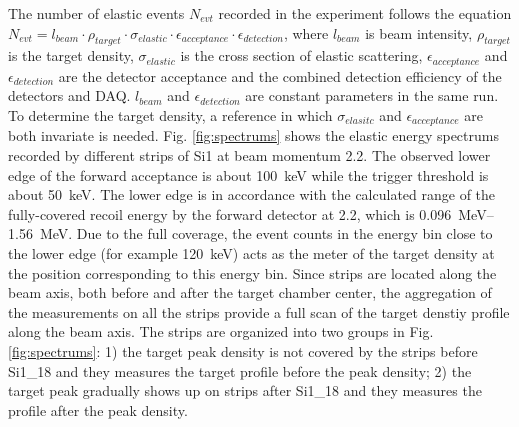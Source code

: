 \documentclass[fleqn,twocolumn,a4paper]{ikpar}
\begin{document}
The number of elastic events $N_{evt}$ recorded in the experiment follows the
equation $N_{evt} =
l_{beam}\cdot\rho_{target}\cdot\sigma_{elastic}\cdot\epsilon_{acceptance}\cdot\epsilon_{detection}$,
where $l_{beam}$ is beam intensity, $\rho_{target}$ is the target density,
$\sigma_{elastic}$ is the cross section of elastic scattering,
$\epsilon_{acceptance}$ and $\epsilon_{detection}$ are the detector acceptance
and the combined
detection efficiency of the detectors and DAQ.
$l_{beam}$ and $\epsilon_{detection}$ are constant parameters in the same run.
To determine the target density, a reference in which $\sigma_{elasitc}$ and
$\epsilon_{acceptance}$ are both invariate is needed.
Fig. \ref{fig:spectrums} shows the elastic energy spectrums recorded by different strips of Si1 at beam momentum \SI{2.2}{\momentum}.
The observed lower edge of the forward acceptance is about \SI{100}{\keV} while the
trigger threshold is about \SI{50}{\keV}.
The lower edge is in accordance with the calculated range of the
fully-covered recoil energy by the forward detector at \SI{2.2}{\momentum},
which is \SIrange{0.096}{1.56}{\MeV}.
Due to the full coverage, the event counts in the energy bin close to the lower edge (for example
\SI{120}{\keV}) acts as the meter of the target density at the position
corresponding to this energy bin.
Since strips are located along the beam axis, both before and after the target
chamber center, the aggregation of the measurements on all the strips provide a full scan of the target denstiy profile along the beam axis.
The strips are organized into two groups in Fig. \ref{fig:spectrums}: 1) the
target peak density is not covered by the strips
before Si1\_18 and they measures the target profile before the peak density; 2) the target
peak gradually shows up on strips after Si1\_18 and they measures the profile
after the peak density.
\end{document}
